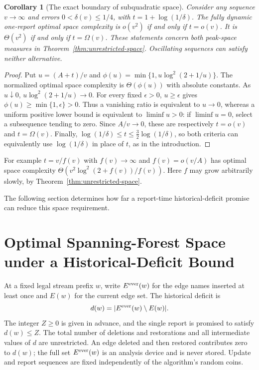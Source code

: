 \documentclass[11pt,letterpaper]{article}
\newtheorem{corollary}[theorem]{Corollary}
\numberwithin{equation}{section}
\begin{document}
\begin{corollary}[The exact boundary of subquadratic space]
\label{cor:quadratic-boundary}
Consider any sequence $v\to\infty$ and errors $0<\delta(v)\le1/4$, with $t=1+\log(1/\delta)$.
The fully dynamic one-report optimal space complexity is $o(v^2)$ if and only if $t=o(v)$.
It is $\Theta(v^2)$ if and only if $t=\Omega(v)$.
These statements concern both peak-space measures in Theorem~\ref{thm:unrestricted-space}.
Oscillating sequences can satisfy neither alternative.
\end{corollary}
\begin{proof}
Put $u=(A+t)/v$ and $\phi(u)=\min\{1,u\log^2(2+1/u)\}$.
The normalized optimal space complexity is $\Theta(\phi(u))$ with absolute constants.
As $u\downarrow0$, $u\log^2(2+1/u)\to0$.
For every fixed $\epsilon>0$, $u\ge\epsilon$ gives $\phi(u)\ge\min\{1,\epsilon\}>0$.
Thus a vanishing ratio is equivalent to $u\to0$, whereas a uniform positive lower bound is equivalent to $\liminf u>0$: if $\liminf u=0$, select a subsequence tending to zero.
Since $A/v\to0$, these are respectively $t=o(v)$ and $t=\Omega(v)$.
Finally, $\log(1/\delta)\le t\le\tfrac32\log(1/\delta)$, so both criteria can equivalently use $\log(1/\delta)$ in place of $t$, as in the introduction.
\end{proof}

For example $t=v/f(v)$ with $f(v)\to\infty$ and $f(v)=o(v/A)$ has optimal space complexity $\Theta(v^2\log^2(2+f(v))/f(v))$.
Here $f$ may grow arbitrarily slowly, by Theorem~\ref{thm:unrestricted-space}.

The following section determines how far a report-time historical-deficit promise can reduce this space requirement.



\section{Optimal Spanning-Forest Space under a Historical-Deficit Bound}
\label{sec:deletion-budget-proof}
\label{sec:historical-deficit-proof}
\label{sec:snapshot-deficit}

At a fixed legal stream prefix $w$, write $E^{\rm ever}(w)$ for the edge names inserted at least once and $E(w)$ for the current edge set.
The historical deficit is
\begin{equation}
d(w)=|E^{\rm ever}(w)\setminus E(w)|.
\label{eq:sd1}
\end{equation}
The integer $Z\ge0$ is given in advance, and the single report is promised to satisfy $d(w)\le Z$.
The total number of deletions and restorations and all intermediate values of $d$ are unrestricted.
An edge deleted and then restored contributes zero to $d(w)$; the full set $E^{\rm ever}(w)$ is an analysis device and is never stored.
Update and report sequences are fixed independently of the algorithm's random coins.
\end{document}
